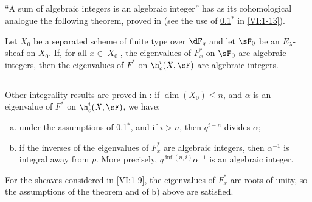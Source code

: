 \subsection{}\label{VI:2-1}

``A sum of algebraic integers is an algebraic integer'' has as its 
cohomological analogue the following theorem, proved in 
 (see the use of \ref{VI:2-1}$^\ast$ in 
\ref{VI:1-13}). 





\begin{theorem*}[2.1*]\label{VI:2-1*}
Let $X_0$ be a separated scheme of finite type over $\dF_q$ and let $\sF_0$ be an 
$E_\lambda$-sheaf on $X_0$. If, for all $x\in |X_0|$, the 
eigenvalues of $F_x^\ast$ on $\sF_0$ are algebraic integers, then the 
eigenvalues of $F^\ast$ on $\h_c^i(X,\sF)$ are algebraic integers. 
\end{theorem*}





\subsection{}\label{VI:2-2}

Other integrality results are proved in 
: if $\dim(X_0)\leqslant n$, and $\alpha$ is 
an eigenvalue of $F^\ast$ on $\h_c^i(X,\sF)$, we have: 
\begin{enumerate}[a)]
  \item under the assumptions of \ref{VI:2-1}$^\ast$, and if $i>n$, then 
    $q^{i-n}$ divides $\alpha$;
  \item if the inverses of the eigenvalues of $F_x^\ast$ are algebraic 
    integers, then $\alpha^{-1}$ is integral away from $p$. More 
    precisely, $q^{\inf(n,i)}\alpha^{-1}$ is an algebraic integer. 
\end{enumerate}

For the sheaves considered in \ref{VI:1-9}, the eigenvalues of 
$F_x^\ast$ are roots of unity, so the assumptions of 
the theorem and of b) above are satisfied. 





\subsection{}\label{VI:2-3}

